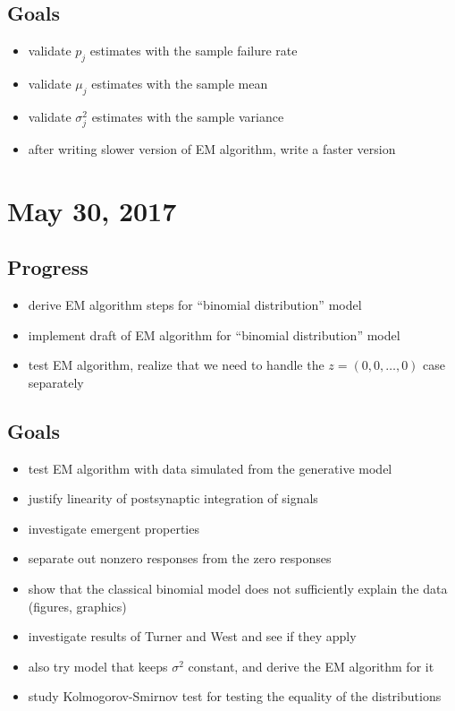 \documentclass{article}
\begin{document}
\subsection{Goals}
\begin{itemize}
  \item validate $p_j$ estimates with the sample failure rate
  \item validate $\mu_j$ estimates with the sample mean
  \item validate $\sigma_j^2$ estimates with the sample variance
  \item after writing slower version of EM algorithm, write a faster version
\end{itemize}

\section{May 30, 2017}
\subsection{Progress}
\begin{itemize}
  \item derive EM algorithm steps for ``binomial distribution'' model
  \item implement draft of EM algorithm for ``binomial distribution'' model
  \item test EM algorithm, realize that we need to handle the $z = (0,0,\dots,0)$ case separately
\end{itemize}

\subsection{Goals}
\begin{itemize}
  \item test EM algorithm with data simulated from the generative model
  \item justify linearity of postsynaptic integration of signals
  \item investigate emergent properties
  \item separate out nonzero responses from the zero responses
  \item show that the classical binomial model does not sufficiently explain the data (figures, graphics)
  \item investigate results of Turner and West and see if they apply
  \item also try model that keeps $\sigma^2$ constant, and derive the EM algorithm for it
  \item study Kolmogorov-Smirnov test for testing the equality of the distributions
\end{itemize}
\end{document}
